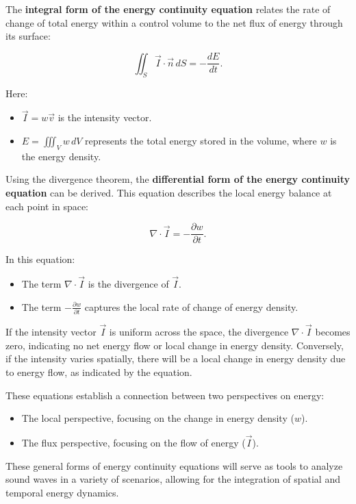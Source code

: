 \documentclass[a4paper]{article}
\begin{document}
The \textbf{integral form of the energy continuity equation} relates the rate of change of total energy within a control volume to the net flux of energy through its surface:

\[
\iint_S \vec{I} \cdot \vec{n} \, dS = -\frac{dE}{dt}.
\]

Here:
\begin{itemize}
    \item \(\vec{I} = w \vec{v}\) is the intensity vector.
\item \(E = \iiint_V w \, dV\) represents the total energy stored in the volume, where \(w\) is the energy density.
\end{itemize}

Using the divergence theorem, the \textbf{differential form of the energy continuity equation} can be derived. This equation describes the local energy balance at each point in space:

\[
\nabla \cdot \vec{I} = -\frac{\partial w}{\partial t}.
\]

In this equation:
\begin{itemize}
\item The term \(\nabla \cdot \vec{I}\) is the divergence of \(\vec{I}\).
\item The term \(-\frac{\partial w}{\partial t}\) captures the local rate of change of energy density.
\end{itemize}


 If the intensity vector \(\vec{I}\) is uniform across the space, the divergence \(\nabla \cdot \vec{I}\) becomes zero, indicating no net energy flow or local change in energy density. Conversely, if the intensity varies spatially, there will be a local change in energy density due to energy flow, as indicated by the equation.

These equations establish a connection between two perspectives on energy:
\begin{itemize}
    \item   The local perspective, focusing on the change in energy density (\(w\)).
\item The flux perspective, focusing on the flow of energy (\(\vec{I}\)).
\end{itemize}
These general forms of energy continuity equations will serve as tools to analyze sound waves in a variety of scenarios, allowing for the integration of spatial and temporal energy dynamics.\\
\end{document}
